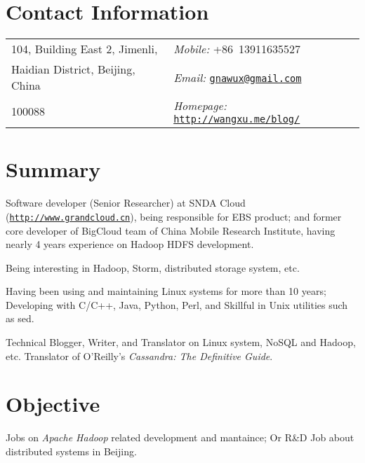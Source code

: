 \documentclass[a4paper,margin,line]{res}
\newcommand{\http}{http:/\hspace{-0.3ex}/}
\begin{document}

\begin{resume}

\section{\sc Contact Information}
\vspace{.05in}
\begin{tabular}{@{}p{2.9in}|p{2.5in}}
104, Building East 2, Jimenli,          & \textit{Mobile:} +86~13911635527\\
Haidian District, Beijing, China        & \textit{Email:}  \href{mailto:gnawux@gmail.com}{\tt gnawux@gmail.com} \\
100088                                  & \textit{Homepage:} \href{http://wangxu.me/blog/}{\tt \http{}wangxu.me/blog/} \\
                                                                   
\end{tabular}

\section{\sc Summary}

Software developer (Senior Researcher) at SNDA Cloud (\href{http://www.grandcloud.cn}{\tt \http{}www.grandcloud.cn}), being responsible for EBS product; and former core developer of BigCloud team of China Mobile Research Institute, having nearly 4 years experience on Hadoop HDFS development. 

Being interesting in {\sc Hadoop}, {\sc Storm}, distributed storage system, etc.

Having been using and maintaining Linux systems for more than 10 years; Developing with C/C++, Java, Python, Perl, and Skillful in Unix utilities such as sed.

Technical Blogger, Writer, and Translator on Linux system, NoSQL and Hadoop, etc. Translator of O'Reilly's \textit{Cassandra: The Definitive Guide}\/.

\section{\sc Objective}

Jobs on {\sl Apache Hadoop} related development and mantaince; Or R\&D Job about distributed systems in Beijing.


\end{resume}
\end{document}
